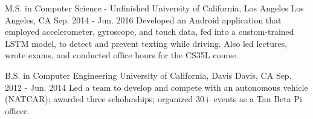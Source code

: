 

\begin{cventries}

  \cventry
    {M.S. in Computer Science - Unfinished} %
    {University of California, Los Angeles} %
    {Los Angeles, CA} %
    {Sep. 2014 - Jun. 2016} %
    {Developed an Android application that employed accelerometer, gyroscope, and touch data, fed into a custom-trained LSTM model, to detect and prevent texting while driving. Also led lectures, wrote exams, and conducted office hours for the CS35L course.} %
    {}

  \cventry
    {B.S. in Computer Engineering} %
    {University of California, Davis} %
    {Davis, CA} %
    {Sep. 2012 - Jun. 2014} %
    {Led a team to develop and compete with an autonomous vehicle (NATCAR); awarded three scholarships; organized 30+ events as a Tau Beta Pi officer.}
    {}

\end{cventries}
